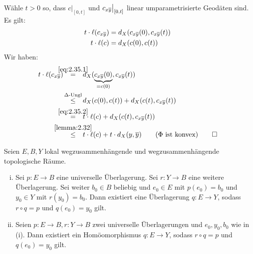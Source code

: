 \vspace{1em}

\begin{beweis}
	Wähle $t > 0$ so, dass $c\big|_{[0,t]}$ und $c_{x \overline{y}} \big|_{[0,t]}$ linear umparametrisierte Geodäten sind.
	Es gilt:
	\begin{align}
		t \cdot \ell(c_{x \overline{y}}) &= d_X(c_{x \overline{y}}(0),c_{x \overline{y}}(t)) \label{eq:2.35.1} \\
		t \cdot \ell(c) &= d_X(c(0),c(t)) \label{eq:2.35.2}
	\end{align}
	Wir haben:
	\begin{align*}
		t \cdot \ell(c_{x \ol{y}}) &\stack{\eqref{eq:2.35.1}}{=} d_X(\Underbrace{c_{x \ol{y}}(0)}{=c(0)},c_{x \ol{y}}(t)) \\
		&\stack{\Delta\text{-Ungl}}{\leq} d_X(c(0),c(t)) + d_X(c(t),c_{x \ol{y}}(t)) \\
		&\stack{\eqref{eq:2.35.2}}{=} t \cdot \ell(c) + d_X(c(t),c_{x \ol{y}}(t)) \\
		&\stack{\ref{lemma:2.32}}{\leq} t \cdot \ell(c) + t \cdot d_X(y,\ol{y}) \qquad (\Phi \text{ ist konvex}) \qedhere
	\end{align*}
\end{beweis}

\begin{bemerkung}
\label{bem:2.36}
	Seien $E,B,Y$ lokal wegzusammenhängende und wegzusammenhängende topologische Räume.
	\begin{enumerate}[(i)]
		\item Sei $p \colon E \rightarrow B$ eine universelle Überlagerung.
		Sei $r \colon Y \rightarrow B$ eine weitere Überlagerung.
		Sei weiter $b_0 \in B$ beliebig und $e_0 \in E$ mit $p(e_0) = b_0$ und $y_0 \in Y$ mit $r(y_0) = b_0$.
		Dann existiert eine Überlagerung $q \colon E \rightarrow Y$, sodass $r \circ q = p$ und $q(e_0) = y_0$ gilt.
		\item Seien $p\colon E \rightarrow B, r\colon Y \rightarrow B$ zwei universelle Überlagerungen und $e_0,y_0,b_0$ wie in (i).
		Dann existiert ein Homöomorphismus $q \colon E \rightarrow Y$, sodass $r \circ q = p$ und $q(e_0) = y_0$ gilt.
	\end{enumerate}
\end{bemerkung}

